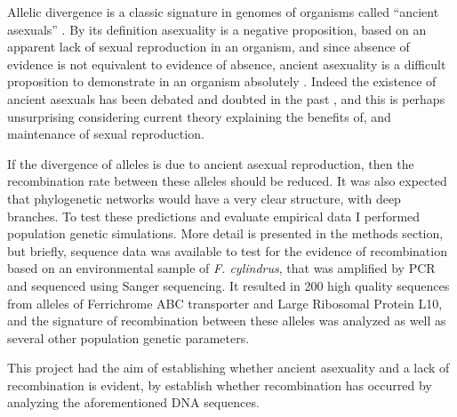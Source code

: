 Allelic divergence is a classic signature in genomes of organisms called
“ancient asexuals” \parencite{Little1996,Pouchkina-Stantcheva2007,Schurko2009}.
By its definition asexuality is a negative proposition, based on an apparent
lack of sexual reproduction in an organism, and since absence of evidence is
not equivalent to evidence of absence, ancient asexuality is a difficult
proposition to demonstrate in an organism absolutely
\parencite{Schurko2009}.
Indeed the existence of ancient asexuals has been debated and doubted in the
past \parencite{Judson1996,Little1996}, and this is perhaps
unsurprising considering current theory explaining the benefits of, and
maintenance of sexual reproduction.

If the divergence of alleles is due to ancient asexual reproduction, then the
recombination rate between these alleles should be reduced.
It was also expected that phylogenetic networks would have a very clear
structure, with deep branches. To test these predictions and evaluate empirical
data I performed population genetic simulations. More detail is presented in the methods section, but briefly, sequence data was available to
test for the evidence of recombination based on an environmental sample of
\textit{F. cylindrus}, that was amplified by PCR and sequenced using Sanger sequencing.
It resulted in 200 high quality sequences from alleles of Ferrichrome ABC
transporter and Large Ribosomal Protein L10, and the signature of recombination
between these alleles was analyzed as well as several other population genetic
parameters.

This project had the aim of establishing whether ancient asexuality and a lack of recombination is evident, by establish whether recombination has occurred by analyzing the aforementioned DNA sequences.

